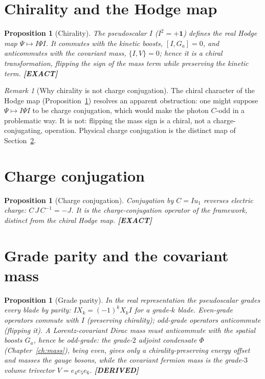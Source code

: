 \documentclass[11pt,oneside]{book}
\newcommand{\status}[1]{{\sffamily\bfseries\color{statuscol}[#1]}}
\theoremstyle{plain}
\newtheorem{proposition}[theorem]{Proposition}
\theoremstyle{definition}
\theoremstyle{remark}
\newtheorem{remark}[theorem]{Remark}
\begin{document}
\section{Chirality and the Hodge map}
\label{sec:chirality}

\begin{proposition}[Chirality]
\label{prop:chirality}
The pseudoscalar $I$ ($I^2=+\mathbf 1$) defines the real Hodge map
$\Psi\mapsto I\Psi I$. It commutes with the kinetic boosts, $[I,G_a]=0$, and
anticommutes with the covariant mass, $\{I,V\}=0$; hence it is a \emph{chiral}
transformation, flipping the sign of the mass term while preserving the kinetic
term. \status{EXACT}
\end{proposition}

\begin{remark}[Why chirality is not charge conjugation]
The chiral character of the Hodge map (Proposition~\ref{prop:chirality}) resolves
an apparent obstruction: one might suppose $\Psi\mapsto I\Psi I$ to be charge
conjugation, which would make the photon $C$-odd in a problematic way. It is not:
flipping the mass sign is a chiral, not a charge-conjugating, operation. Physical
charge conjugation is the distinct map of Section~\ref{sec:charge-conj}.
\end{remark}

\section{Charge conjugation}
\label{sec:charge-conj}

\begin{proposition}[Charge conjugation]
\label{prop:charge-conj}
Conjugation by $C=Iu_1$ reverses electric charge: $C\,J\,C^{-1}=-J$. It is the
charge-conjugation operator of the framework, distinct from the chiral Hodge map.
\status{EXACT}
\end{proposition}

\section{Grade parity and the covariant mass}
\label{sec:grade-parity}

\begin{proposition}[Grade parity]
\label{prop:gradeparity}
In the real representation the pseudoscalar grades every blade by parity:
$IX_k=(-1)^kX_kI$ for a grade-$k$ blade. Even-grade operators commute with $I$
(preserving chirality); odd-grade operators anticommute (flipping it). A
Lorentz-covariant Dirac mass must anticommute with the spatial boosts $G_a$, hence
be odd-grade: the grade-$2$ adjoint condensate $\Phi$ (Chapter~\ref{ch:mass}), being
even, gives only a chirality-preserving energy offset and masses the gauge bosons,
while the covariant \emph{fermion} mass is the grade-$3$ volume trivector
$V=e_4e_5e_6$. \status{DERIVED}
\end{proposition}
\end{document}
